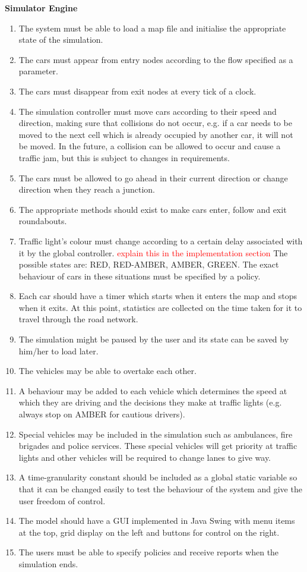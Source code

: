 \documentclass{article}
\begin{document}
	
	\noindent
	{\bf Simulator Engine}
	\begin{enumerate}
		
		\item  The system must be able to load a map file and initialise the appropriate state of the simulation.
		
		\item The cars must appear from entry nodes according to the flow specified as a parameter.
		\item The cars must disappear from exit nodes at every tick of a clock.
		\item The simulation controller must move cars according to their speed and direction, making sure that collisions do not occur, e.g. if a car needs to be moved to the next cell which is already occupied by another car, it will not be moved. In the future, a collision can be allowed to occur and cause a traffic jam, but this is subject to changes in requirements.
		\item The cars must be allowed to go ahead in their current direction or change direction when they reach a junction. 
		\item The appropriate methods should exist to make cars enter, follow and exit roundabouts.
		\item Traffic light's colour must change according to a certain delay associated with it by the global controller. \textcolor{red}{explain this in the implementation section} The possible states are: RED, RED-AMBER, AMBER, GREEN. The exact behaviour of cars in these situations must be specified by a policy.
		\item Each car should have a timer which starts when it enters the map and stops when it exits. At this point, statistics are collected on the time taken for it to travel through the road network.
		\item  The simulation might be paused by the user and its state can be saved by him/her to load later. 
		\item The vehicles may be able to overtake each other. 
		\item  A behaviour may be added to each vehicle which determines the  speed at which they are driving and the decisions they make at traffic lights (e.g. always stop on AMBER for cautious drivers).
		\item Special vehicles may be included in the simulation such as ambulances, fire brigades and police services. These special vehicles will get priority at traffic lights and other vehicles will be required to change lanes to give way. 
		\item A time-granularity constant should be included as a global static variable so that it can be changed easily to test the behaviour of the system and give the user freedom of control. 
		\item The model should have a GUI implemented in Java Swing with menu items at the top, grid display on the left and buttons for control on the right. 
		\item The users must be able to specify policies and receive reports when the simulation ends.  
		
	\end{enumerate}
	
\end{document}
